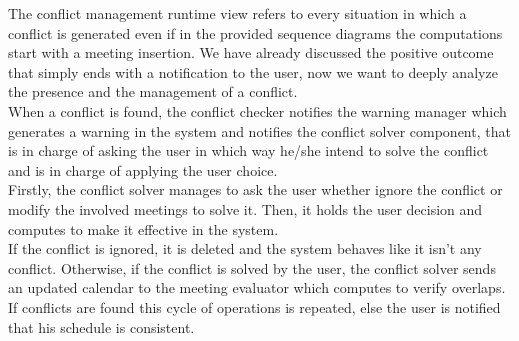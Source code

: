 The conflict management runtime view refers to every situation in which a conflict is generated even if in the provided sequence diagrams the computations start with a meeting insertion. We have already discussed the positive outcome that simply ends with a notification to the user, now we want to deeply analyze the presence and the management of a conflict. \\
When a conflict is found, the conflict checker notifies the warning manager which generates a warning in the system and notifies the conflict solver component, that is in charge of asking the user in which way he/she intend to solve the conflict and is in charge of applying the user choice. \\
Firstly, the conflict solver manages to ask the user whether ignore the conflict or modify the involved meetings to solve it. Then, it holds the user decision and computes to make it effective in the system. \\
If the conflict is ignored, it is deleted and the system behaves like it isn't any conflict. Otherwise, if the conflict is solved by the user, the conflict solver sends an updated calendar to the meeting evaluator which computes to verify overlaps. \\
If conflicts are found this cycle of operations is repeated, else the user is notified that his schedule is consistent. \\

